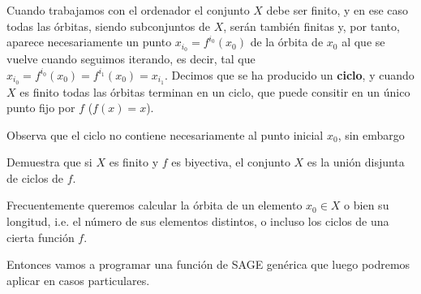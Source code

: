 Cuando trabajamos con el ordenador el conjunto $X$ debe ser finito, y en ese
caso todas las \'orbitas, siendo subconjuntos de $X$, ser\'an tambi\'en finitas
y, por tanto, aparece necesariamente un  punto $x_{i_0}=f^{i_0}(x_0)$ de la
\'orbita de $x_0$ al que se vuelve cuando seguimos iterando, es decir, tal que
$x_{i_0}=f^{i_0}(x_0)=f^{i_1}(x_0)=x_{i_1}$. 
Decimos que se ha producido un {\bf ciclo}, y cuando $X$ es finito todas las
\'orbitas terminan en un ciclo, que puede consitir en un \'unico punto fijo por
$f$ ($f(x)=x$). 

Observa que el ciclo no contiene necesariamente al punto inicial $x_0$, sin
embargo
\par
\medskip
\par
\begin{ejer}
Demuestra que si $X$ es finito y $f$ es biyectiva,  el conjunto
$X$ es la uni\'on disjunta de ciclos de $f$. 
\end{ejer}

Frecuentemente queremos calcular la \'orbita de un elemento $x_0\in X$ o bien su
longitud, i.e. el n\'umero de sus elementos distintos, o incluso los ciclos de
una cierta funci\'on $f$. 



Entonces vamos a programar una funci\'on de SAGE gen\'erica que luego podremos
aplicar en casos particulares. 

